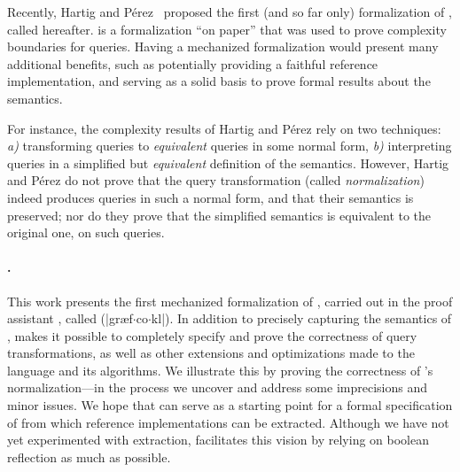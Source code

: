 Recently, Hartig and Pérez~\cite{gqlph} proposed the first (and so far only) formalization of \gql, called \HP hereafter. 
\HP is a formalization ``on paper'' that was used to prove complexity boundaries for \gql queries. Having a mechanized formalization would present many additional benefits, such as potentially providing a faithful reference implementation, and serving as a solid basis to prove formal results about the \gql semantics. 

For instance, the complexity results of Hartig and Pérez rely on two techniques: {\em a)} transforming queries to {\em equivalent} queries in some  normal form, {\em b)} interpreting queries in a simplified but {\em equivalent} definition of the semantics. However, Hartig and Pérez do not prove that the query transformation (called {\em normalization}) indeed produces queries in such a normal form, and that their semantics is preserved; nor do they prove that the simplified semantics is equivalent to the original one, on such queries.



\paragraph{\gcoql.} This work presents the first mechanized formalization of \gql, carried out in the \coq proof assistant , called \gcoql (|græf$\cdot$co$\cdot$k{\pmschwa}l|). In addition to precisely capturing the semantics of \gql, \gcoql makes it possible to completely specify and prove the correctness of query transformations, as well as other extensions and optimizations made to the language and its algorithms. We illustrate this by proving the correctness of \HP's normalization---in the process we uncover and address some imprecisions and minor issues.
We hope that \gcoql can serve as a starting point for a formal specification of \gql from which reference implementations can be extracted. Although we have not yet experimented with extraction, \gcoql facilitates this vision by relying on boolean reflection as much as possible.

